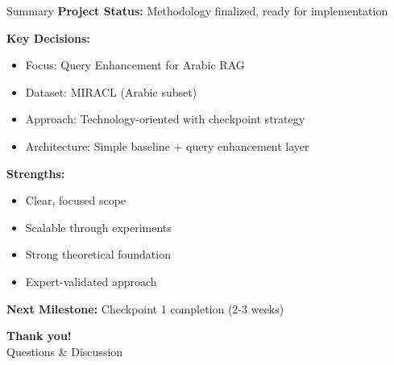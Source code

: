\documentclass[aspectratio=169]{beamer}
\begin{document}
\begin{frame}{Summary}
\textbf{Project Status:} Methodology finalized, ready for implementation

\vspace{0.3cm}

\textbf{Key Decisions:}
\begin{itemize}
    \item Focus: Query Enhancement for Arabic RAG
    \item Dataset: MIRACL (Arabic subset)
    \item Approach: Technology-oriented with checkpoint strategy
    \item Architecture: Simple baseline + query enhancement layer
\end{itemize}

\vspace{0.3cm}

\textbf{Strengths:}
\begin{itemize}
    \item Clear, focused scope
    \item Scalable through experiments
    \item Strong theoretical foundation
    \item Expert-validated approach
\end{itemize}

\vspace{0.3cm}

\textbf{Next Milestone:} Checkpoint 1 completion (2-3 weeks)

\vspace{0.5cm}

\begin{center}
\Large{\textbf{Thank you!}}\\
\vspace{0.3cm}
\normalsize{Questions \& Discussion}
\end{center}
\end{frame}
\end{document}
